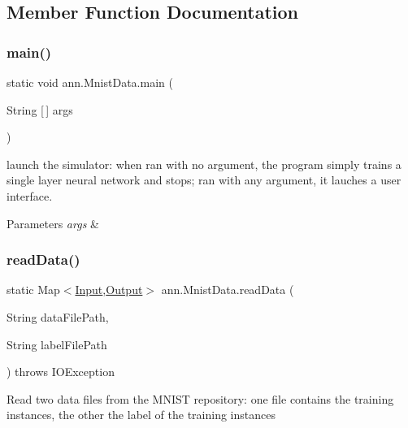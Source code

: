 \subsection{Member Function Documentation}
\mbox{\label{classann_1_1_mnist_data_a927889494e75519b70b5364b391cb37d}} 
\subsubsection{\texorpdfstring{main()}{main()}}
{\footnotesize\ttfamily static void ann.\+Mnist\+Data.\+main (\begin{DoxyParamCaption}\item[{String \mbox{[}$\,$\mbox{]}}]{args }\end{DoxyParamCaption})\hspace{0.3cm}{\ttfamily [static]}}

launch the simulator\+: when ran with no argument, the program simply trains a single layer neural network and stops; ran with any argument, it lauches a user interface.


\begin{DoxyParams}{Parameters}
{\em args} & \\
\hline
\end{DoxyParams}
\mbox{\label{classann_1_1_mnist_data_af92e544d110867d6a1324bfb9ec6b3f2}} 
\subsubsection{\texorpdfstring{read\+Data()}{readData()}}
{\footnotesize\ttfamily static Map$<$\hyperlink{classann_1_1_input}{Input},\hyperlink{classann_1_1_output}{Output}$>$ ann.\+Mnist\+Data.\+read\+Data (\begin{DoxyParamCaption}\item[{String}]{data\+File\+Path,  }\item[{String}]{label\+File\+Path }\end{DoxyParamCaption}) throws I\+O\+Exception\hspace{0.3cm}{\ttfamily [static]}}

Read two data files from the M\+N\+I\+ST repository\+: one file contains the training instances, the other the label of the training instances


